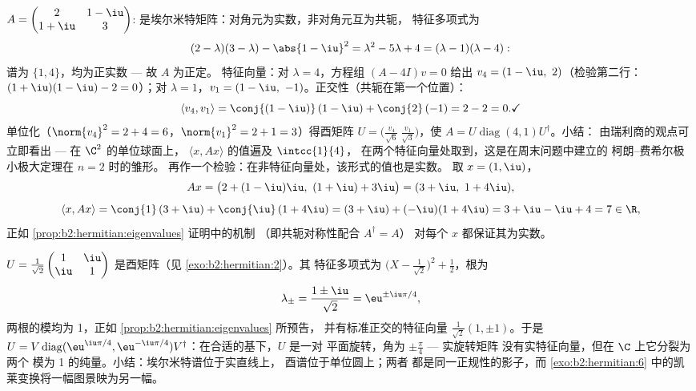 \begin{example}[正定埃尔米特矩阵的计算]\label{ex:b2:hermitian:pdrun}
$A = \begin{pmatrix} 2 & 1-\iu\\ 1+\iu & 3\end{pmatrix}$:
是埃尔米特矩阵：对角元为实数，非对角元互为共轭，
特征多项式为
\[
(2-\lambda)(3-\lambda) - \abs{1-\iu}^2
= \lambda^2 - 5\lambda + 4
= (\lambda - 1)(\lambda - 4) :
\]
谱为 $\{1, 4\}$，均为正实数 --- 故 $A$ 为正定。
特征向量：对 $\lambda = 4$，方程组 $(A -
4I)v = 0$ 给出 $v_4 = (1 - \iu,\ 2)$（检验第二行：
$(1+\iu)(1-\iu) - 2 = 0$）；对 $\lambda = 1$，$v_1 = (1 - \iu,\
-1)$。正交性（共轭在第一个位置）：
\[
\langle v_4, v_1\rangle
= \conj{(1-\iu)}\,(1-\iu) + \conj{2}\,(-1)
= 2 - 2 = 0 . \checkmark
\]
单位化（$\norm{v_4}^2 = 2 + 4 = 6$，$\norm{v_1}^2 = 2 + 1
= 3$）得酉矩阵 $U = \bigl(\frac{v_4}{\sqrt6}\
\frac{v_1}{\sqrt3}\bigr)$，使 $A =
U\operatorname{diag}(4,1)U^\dagger$。小结：
由瑞利商的观点可立即看出 --- 在 $\C^2$ 的单位球面上，
$\langle x, Ax\rangle$ 的值遍及 $\intcc{1}{4}$，
在两个特征向量处取到，这是在周末问题中建立的
柯朗–费希尔极小极大定理在 $n = 2$ 时的雏形。
再作一个检验：在非特征向量处，该形式的值也是实数。
取 $x = (1, \iu)$，
\[
Ax = \bigl(2 + (1-\iu)\iu,\ (1+\iu) + 3\iu\bigr)
= (3 + \iu,\ 1 + 4\iu),
\]
\[
\langle x, Ax\rangle = \conj{1}\,(3+\iu) +
\conj{\iu}\,(1+4\iu)
= (3 + \iu) + (-\iu)(1 + 4\iu) = 3 + \iu - \iu + 4 = 7 \in
\R ,
\]
正如 \cref{prop:b2:hermitian:eigenvalues} 证明中的机制
（即共轭对称性配合 $A^\dagger = A$）
对每个 $x$ 都保证其为实数。
\end{example}

\begin{example}[酉矩阵的对角化]\label{ex:b2:hermitian:unitary}
$U = \frac{1}{\sqrt2}\begin{pmatrix} 1 & \iu\\ \iu & 1
\end{pmatrix}$ 是酉矩阵（见 \cref{exo:b2:hermitian:2}）。其
特征多项式为 $\bigl(X - \frac{1}{\sqrt2}\bigr)^2
+ \frac12$，根为
\[
\lambda_\pm = \frac{1 \pm \iu}{\sqrt2} = \eu^{\pm\iu\pi/4},
\]
两根的模均为 1，正如 \cref{prop:b2:hermitian:eigenvalues} 所预告，
并有标准正交的特征向量 $\frac{1}{\sqrt2}(1, \pm1)$。于是 $U =
V\operatorname{diag}(\eu^{\iu\pi/4},
\eu^{-\iu\pi/4})V^\dagger$：在合适的基下，$U$ 是一对
平面旋转，角为 $\pm\frac\pi4$ --- 实旋转矩阵
没有实特征向量，但在 $\C$ 上它分裂为两个
模为 1 的纯量。小结：埃尔米特谱位于实直线上，
酉谱位于单位圆上；两者
都是同一正规性的影子，而
\cref{exo:b2:hermitian:6} 中的凯莱变换将一幅图景映为另一幅。
\end{example}

